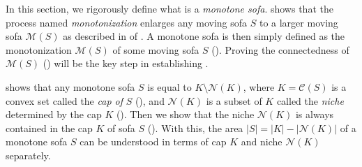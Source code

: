 In this section, we rigorously define what is a \emph{monotone sofa}.  shows that the process named \emph{monotonization} enlarges any moving sofa \(S\) to a larger moving sofa \(\mathcal{M}(S)\) as described in  of . A monotone sofa is then simply defined as the monotonization \(\mathcal{M}(S)\) of some moving sofa \(S\) (). Proving the connectedness of \(\mathcal{M}(S)\) () will be the key step in establishing .

 shows that any monotone sofa \(S\) is equal to \(K \setminus \mathcal{N}(K)\), where \(K = \mathcal{C}(S)\) is a convex set called the \emph{cap of} \(S\) (), and \(\mathcal{N}(K)\) is a subset of \(K\) called the \emph{niche} determined by the cap \(K\) (). Then we show that the niche \(\mathcal{N}(K)\) is always contained in the cap \(K\) of sofa \(S\) (). With this, the area \(|S| = |K| - |\mathcal{N}(K)|\) of a monotone sofa \(S\) can be understood in terms of cap \(K\) and niche \(\mathcal{N}(K)\) separately.